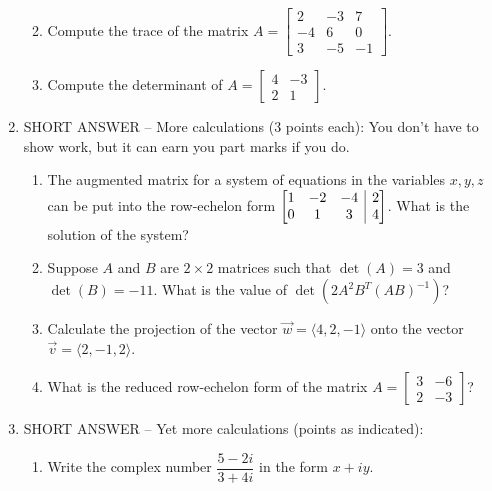 \documentclass[12pt]{article}
\makeatletter
\newcommand{\points}[1]{\marginpar{\hspace{24pt}[#1]}}
\newenvironment{amatrix}[1]{%
  \left[\begin{array}{@{}*{#1}{c}|c@{}}
}{%
  \end{array}\right]
}
\newcommand{\bam}{\begin{amatrix}}
\newcommand{\eam}{\end{amatrix}}
\newcommand{\bbm}{\begin{bmatrix}}
\newcommand{\ebm}{\end{bmatrix}}
\makeatother
\begin{document}
\begin{enumerate}
\begin{enumerate}
\vspace{1.5in}

 \item Compute the trace of the matrix $A = \bbm 2&-3&7\\-4&6&0\\3&-5&-1\ebm$.

\vspace{1.25in}

 \item Compute the determinant of $A = \bbm 4&-3\\2&1\ebm$.

\end{enumerate}
\newpage

\item SHORT ANSWER -- More calculations (3 points each): You don't have to show work, but it can earn you part marks if you do.

\begin{enumerate}
 \item The augmented matrix for a system of equations in the variables $x,y,z$ can be put into the row-echelon form $\bam{3}1&-2&-4&2\\0&1&3&4\eam$. What is the solution of the system?

\vspace{1.75in}
 
 \item Suppose $A$ and $B$ are $2\times 2$ matrices such that $\det(A) = 3$ and $\det(B)=-11$. What is the value of $\det(2A^2B^T(AB)^{-1})$?


\vspace{1.6in}

 \item Calculate the projection of the vector $\vec{w} = \langle 4,2,-1\rangle$ onto the vector $\vec{v} = \langle 2,-1,2\rangle$.

\vspace{1.75in}

 \item What is the reduced row-echelon form of the matrix $A = \bbm 3&-6\\2&-3\ebm$?


\end{enumerate}
\newpage

\item SHORT ANSWER -- Yet more calculations (points as indicated):

\begin{enumerate}
 \item Write the complex number $\dfrac{5-2i}{3+4i}$ in the form $x+iy$. \points{3}


\end{enumerate}
\end{enumerate}
\end{document}
